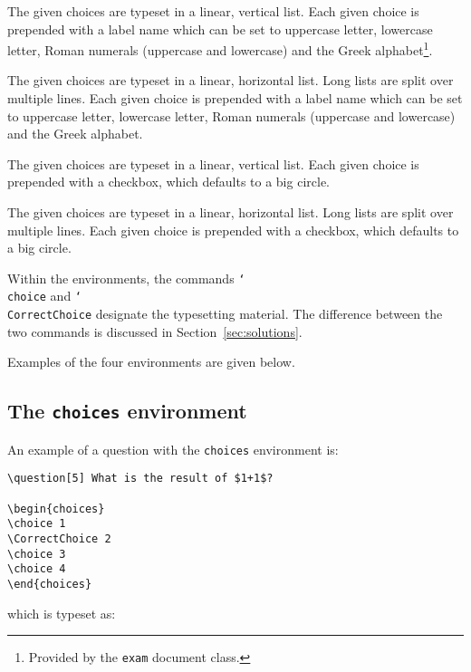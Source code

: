 \documentclass[12pt,a4paper]{exam}
\providecommand{\texorpdfstring}[2]{#1}
\newcommand{\bs}{\texorpdfstring{\char`\\}{}}
\begin{document}
\begin{description}[labelindent=2ex]
\item[\texttt{choices}] The given choices are typeset in a linear, vertical list.
Each given choice is prepended with a label name which can be set to uppercase
letter, lowercase letter, Roman numerals (uppercase and lowercase) and the Greek
alphabet\footnote{Provided by the \texttt{exam} document class.}.

\item[\texttt{oneparchoices}] The given choices are typeset in a linear, horizontal list.
Long lists are split over multiple lines.
Each given choice is prepended with a label name which can be set to uppercase
letter, lowercase letter, Roman numerals (uppercase and lowercase) and the Greek
alphabet.

\item[\texttt{checkboxes}] The given choices are typeset in a linear, vertical list.
Each given choice is prepended with a checkbox, which defaults to a big circle. 

\item[\texttt{oneparcheckboxes}] The given choices are typeset in a linear, horizontal
list. Long lists are split over multiple lines.
Each given choice is prepended with a checkbox, which defaults to a big circle.

\end{description}

 Within the environments, the
commands \texttt{\bs choice} and \texttt{\bs CorrectChoice} designate the
typesetting material. The difference between the two commands is discussed
in Section~\ref{sec:solutions}.

Examples of the four environments are given below.

\subsection{The \texttt{choices} environment}

An example of a question with the \texttt{choices} environment is:

\begin{lstlisting}
\question[5] What is the result of $1+1$?

\begin{choices}
\choice 1
\CorrectChoice 2
\choice 3
\choice 4
\end{choices}
\end{lstlisting}

which is typeset as:
\end{document}
